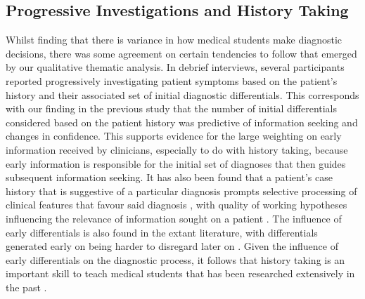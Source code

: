 \documentclass[a4paper, nobind]{templates/ociamthesis}
\begin{document}
\subsection*{Progressive Investigations and History Taking}\label{progressive-investigations-and-history-taking}

Whilst finding that there is variance in how medical students make diagnostic decisions, there was some agreement on certain tendencies to follow that emerged by our qualitative thematic analysis. In debrief interviews, several participants reported progressively investigating patient symptoms based on the patient's history and their associated set of initial diagnostic differentials. This corresponds with our finding in the previous study that the number of initial differentials considered based on the patient history was predictive of information seeking and changes in confidence. This supports evidence for the large weighting on early information received by clinicians, especially to do with history taking, because early information is responsible for the initial set of diagnoses that then guides subsequent information seeking. It has also been found that a patient's case history that is suggestive of a particular diagnosis prompts selective processing of clinical features that favour said diagnosis \autocite{leblanc_believing_2002}, with quality of working hypotheses influencing the relevance of information sought on a patient \autocite{brooks_difficulty_2000}. The influence of early differentials is also found in the extant literature, with differentials generated early on being harder to disregard later on \autocite{kourtidis_influences_2022,redelmeier_fallacy_2023}. Given the influence of early differentials on the diagnostic process, it follows that history taking is an important skill to teach medical students that has been researched extensively in the past \autocite{keifenheim_teaching_2015}.
\end{document}
